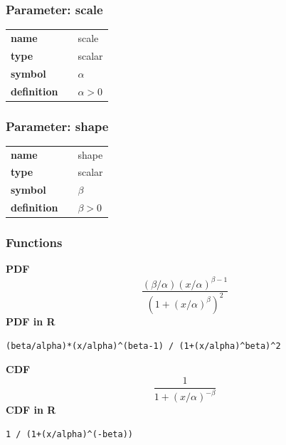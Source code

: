 \subsubsection*{Parameter: scale}

\noindent\begin{tabular}{p{2cm}cl}
\textbf{name} & & scale \\
\textbf{type} & & scalar \\
\textbf{symbol} & & $\alpha$  \\
\textbf{definition} & & $\alpha > 0$
\end{tabular}
\subsubsection*{Parameter: shape}

\noindent\begin{tabular}{p{2cm}cl}
\textbf{name} & & shape \\
\textbf{type} & & scalar \\
\textbf{symbol} & & $\beta$  \\
\textbf{definition} & & $\beta > 0$
\end{tabular}
\subsubsection*{Functions}

\smallskip \noindent \hspace{.2cm} \textbf{PDF} 
\begin{equation*}\frac{(\beta/\alpha)(x/\alpha)^{\beta-1}}{(1+(x/\alpha)^\beta)^2}\end{equation*}
\smallskip \noindent \hspace{.2cm} \textbf{PDF in R}  
\begin{verbatim}(beta/alpha)*(x/alpha)^(beta-1) / (1+(x/alpha)^beta)^2\end{verbatim}
\smallskip \noindent \hspace{.2cm} \textbf{CDF} 
\begin{equation*}\frac{1}{1+(x/\alpha)^{-\beta}}\end{equation*}
\smallskip \noindent \hspace{.2cm} \textbf{CDF in R} 
\begin{verbatim}1 / (1+(x/alpha)^(-beta))\end{verbatim}
\smallskip
